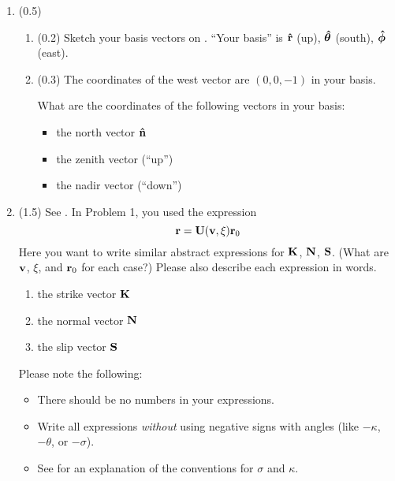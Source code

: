 \documentclass[11pt,titlepage,fleqn]{article}
\newcommand{\rotangB}{\xi}    %
\newcommand{\rotvec}{\bv}      %
\begin{document}
\begin{enumerate}


\item (0.5)
\begin{enumerate}
\item (0.2) Sketch your basis vectors on . ``Your basis'' is $\mbox{\boldmath{$\hat{\rm r}$}}$ (up), $\mbox{\boldmath{$\hat{\theta}$}}$ (south), $\mbox{\boldmath{$\hat{\phi}$}}$ (east).

\item (0.3) The coordinates of the west vector are $(0,0,-1)$ in your basis.

What are the coordinates of the following vectors in your basis:

\begin{itemize}
\item the north vector $\mbox{\boldmath{$\hat{\rm n}$}}$

\item the zenith vector (``up'')

\item the nadir vector (``down'')
\end{itemize}
\end{enumerate}


\item (1.5) See . In Problem 1, you used the expression
%
\begin{equation}
\br = \bU(\rotvec,\rotangB)\br_0
\end{equation}
%
Here you want to write similar abstract expressions for $\mbox{${\bf K}$}$, $\mbox{${\bf N}$}$, $\mbox{${\bf S}$}$. (What are $\rotvec$, $\rotangB$, and $\mbox{${\bf r}$}_0$ for each case?)
Please also describe each expression in words.
%
\begin{enumerate}
\item the strike vector $\mbox{${\bf K}$}$
\item the normal vector $\mbox{${\bf N}$}$
\item the slip vector $\mbox{${\bf S}$}$
\end{enumerate}
%
Please note the following:
%
\begin{itemize}
\item There should be no numbers in your expressions.
\item Write all expressions {\em without} using negative signs with angles (like $-\kappa$, $-\theta$, or $-\sigma$).
\item See  for an explanation of the conventions for $\sigma$ and $\kappa$.
\end{itemize}


\end{enumerate}
\end{document}
